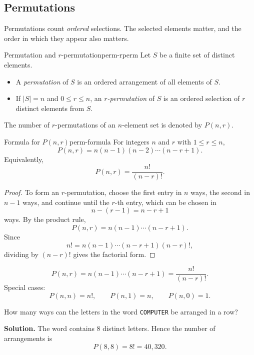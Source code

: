\subsection{Permutations}

Permutations count \emph{ordered} selections. The selected elements matter, and the order in which they appear also matters.

\begin{definition}{Permutation and $r$-permutation}{perm-rperm}
Let $S$ be a finite set of distinct elements.
\begin{itemize}[leftmargin=*]
    \item A \emph{permutation} of $S$ is an ordered arrangement of all elements of $S$.
    \item If $|S|=n$ and $0\le r\le n$, an \emph{$r$-permutation} of $S$ is an ordered selection of $r$ distinct elements from $S$.
\end{itemize}
The number of $r$-permutations of an $n$-element set is denoted by $P(n,r)$.
\end{definition}

\begin{theorem}{Formula for $P(n,r)$}{perm-formula}
For integers $n$ and $r$ with $1\le r\le n$,
\[
P(n,r)=n(n-1)(n-2)\cdots (n-r+1).
\]
Equivalently,
\[
P(n,r)=\frac{n!}{(n-r)!}.
\]
\end{theorem}

\begin{proof}
To form an $r$-permutation, choose the first entry in $n$ ways, the second in $n-1$ ways, and continue until the $r$-th entry, which can be chosen in
\[
n-(r-1)=n-r+1
\]
ways. By the product rule,
\[
P(n,r)=n(n-1)\cdots(n-r+1).
\]
Since
\[
n!=n(n-1)\cdots(n-r+1)(n-r)!,
\]
dividing by $(n-r)!$ gives the factorial form.
\end{proof}

\begin{keyformula}[title={$r$-permutations}]
\[
P(n,r)=n(n-1)\cdots(n-r+1)=\frac{n!}{(n-r)!}.
\]
Special cases:
\[
P(n,n)=n!,\qquad P(n,1)=n,\qquad P(n,0)=1.
\]
\end{keyformula}

\begin{examplebox}[title={COMPUTER}]
How many ways can the letters in the word \texttt{COMPUTER} be arranged in a row?

\textbf{Solution.}
The word contains $8$ distinct letters. Hence the number of arrangements is
\[
P(8,8)=8!=40{,}320.
\]
\end{examplebox}

